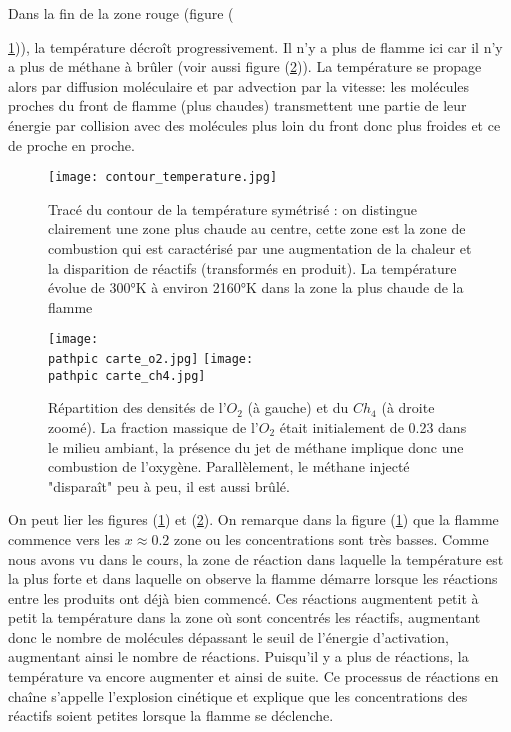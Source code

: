 \documentclass[a4paper,10pt]{article}
\newcommand\pathpic{/home/nsaura/Documents/new_doc/Latex_files/Pic/BE_combustion/}
\newcommand{\chq}{$Ch_4$ }
\newcommand{\od}{$O_2$ }
\begin{document}
Dans la fin de la zone rouge (figure ({\ref{temp_flamme})), la température décroît progressivement. Il n'y a plus de flamme ici car il n'y a plus de méthane à brûler (voir aussi figure (\ref{carte_espece})). La température se propage alors par diffusion moléculaire et par advection par la vitesse: les molécules proches du front de flamme (plus chaudes) transmettent une partie de leur énergie par collision avec des molécules plus loin du front donc plus froides et ce de proche en proche.

\begin{figure}[ht!]
\centering
\texttt{[image: contour\_temperature.jpg]}
\caption{\footnotesize{Tracé du contour de la température symétrisé : on distingue clairement une zone plus chaude au centre, cette zone est la zone de combustion qui est caractérisé par une augmentation de la chaleur et la disparition de réactifs (transformés en produit). La température évolue de 300°K à environ 2160°K dans la zone la plus chaude de la flamme}}
\label{temp_flamme}
\end{figure}

\begin{figure}[ht!]

\texttt{[image: \\pathpic carte\_o2.jpg]} \hfill
\texttt{[image: \\pathpic carte\_ch4.jpg]}
\caption{Répartition des densités de l'\od (à gauche) et du \chq (à droite zoomé). La fraction massique de l'\od était initialement de 0.23 dans le milieu ambiant, la présence du jet de méthane implique donc une combustion de l'oxygène. Parallèlement, le méthane injecté "disparaît" peu à peu, il est aussi brûlé.}
\label{carte_espece}
\end{figure}
On peut lier les figures (\ref{temp_flamme}) et (\ref{carte_espece}). On remarque dans la figure (\ref{temp_flamme}) que la flamme commence vers les $x \approx 0.2$ zone ou les concentrations sont très basses. Comme nous avons vu dans le cours, la zone de réaction dans laquelle la température est la plus forte et dans laquelle on observe la flamme démarre lorsque les réactions entre les produits ont déjà bien commencé. Ces réactions augmentent petit à petit la température dans la zone où sont concentrés les réactifs, augmentant donc le nombre de molécules dépassant le seuil de l'énergie d'activation, augmentant ainsi le nombre de réactions. Puisqu'il y a plus de réactions, la température va encore augmenter et ainsi de suite. Ce processus de réactions en chaîne s'appelle l'explosion cinétique et explique que les concentrations des réactifs soient petites lorsque la flamme se déclenche. 

}
\end{document}
